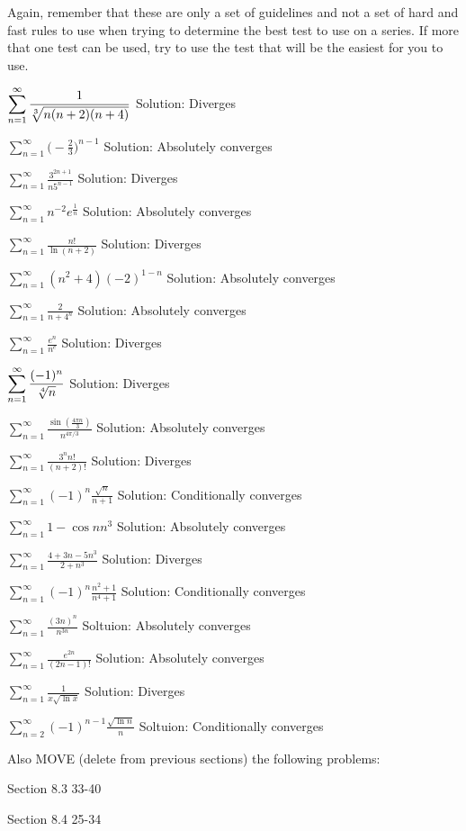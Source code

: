 \documentclass[10pt]{article}
\newcommand{\ds}{\displaystyle}
\begin{document}
Again, remember that these are only a set of guidelines and not a set of hard and fast rules to use when trying to determine the best test to use on a series. If more that one test can be used, try to use the test that will be the easiest for you to use.



$\ds \sum_{n=1}^\infty \frac{1}{\root 3 \of {n(n+2)(n+4)}}$  		Solution: Diverges

$\ds \sum_{n=1}^\infty \biggl( -\frac23\biggr)^{n-1}$			Solution: Absolutely converges

$\ds \sum_{n=1}^\infty \frac{3^{2n+1}}{n5^{n-1}}$			Solution: Diverges

$\ds \sum_{n=1}^\infty n^{-2}e^{\frac{1}{n}}$				Solution: Absolutely converges

$\ds \sum_{n=1}^\infty \frac{n!}{\ln (n+2)}$					Solution: Diverges

$\ds \sum_{n=1}^\infty(n^2+4)(-2)^{1-n}$					Solution: Absolutely converges

$\ds \sum_{n=1}^\infty \frac{2}{n+4^n}$					Solution: Absolutely converges

$\ds \sum_{n=1}^\infty \frac{e^n}{n^e}$					Solution: Diverges

$\ds \sum_{n=1}^\infty \frac{(-1)^n}{\root 4 \of n}$			Solution: Diverges

$\ds \sum_{n=1}^\infty \frac{\sin( \frac{4\pi n}{3})}{n^{4\pi/3}}$	Solution: Absolutely converges 

$\ds \sum_{n=1}^\infty \frac{3^n n!}{(n+2)!}$				Solution: Diverges

$\ds \sum_{n=1}^\infty (-1)^n \frac{\sqrt n}{n+1}$			Solution: Conditionally converges

$\ds \sum_{n=1}^\infty {1-\cos n}{n^3}$					Solution: Absolutely converges

$\ds \sum_{n=1}^\infty \frac{4+3n-5n^3}{2+n^3}$			Solution: Diverges

$\ds \sum_{n=1}^\infty (-1)^n \frac{n^2+1}{n^4+1}$			Solution: Conditionally converges 

$\ds \sum_{n=1}^\infty \frac{(3n)^n}{n^{3n}}$				Soltuion: Absolutely converges

$\ds \sum_{n=1}^\infty \frac{e^{2n}}{(2n-1)!}$				Solution: Absolutely converges

$\ds \sum_{n=1}^\infty \frac{1}{x\sqrt{\ln x}}$				Solution: Diverges

$\ds \sum_{n=2}^\infty (-1)^{n-1}\frac{\sqrt{\ln n}}{n}$			Soltuion: Conditionally converges


Also MOVE (delete from previous sections) the following problems:

Section 8.3    33-40

Section 8.4     25-34
\end{document}

